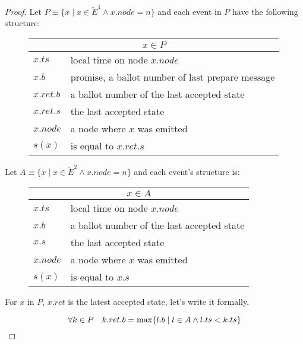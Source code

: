 \documentclass[12pt]{article}
\theoremstyle{definition}
\begin{document}
\begin{appendices}
\begin{proof}
  Let $P \equiv \{ x \;|\; x \in \ddot{E}^1 \land x.node = n\}$ and each event in $P$ have the following structure:

  \begin{figure}[!h]
    \centering
    \begin{tabular}{|l|l|}
    \hline
    \multicolumn{2}{|c|}{$x \in P$}\\
    \hline
    $x.ts$ & local time on node $x.node$\\
    \hline
    $x.b$ & promise, a ballot number of last prepare message\\
    \hline
    $x.ret.b$ & a ballot number of the last accepted state\\
    \hline
    $x.ret.s$ & the last accepted state\\
    \hline
    $x.node$ & a node where $x$ was emitted\\
    \hline
    \hline
    $s(x)$ & is equal to $x.ret.s$\\
    \hline
    \end{tabular}
  \end{figure}
  
  Let $A \equiv \{ x \;|\; x \in \ddot{E}^2 \land x.node = n \}$ and each event's structure is:

  \begin{figure}[!h]
    \centering
    \begin{tabular}{|l|l|}
    \hline
    \multicolumn{2}{|c|}{$x \in A$}\\
    \hline
    $x.ts$ & local time on node $x.node$\\
    \hline
    $x.b$ & a ballot number of the last accepted state\\
    \hline
    $x.s$ & the last accepted state\\
    \hline
    $x.node$ & a node where $x$ was emitted\\
    \hline
    \hline
    $s(x)$ & is equal to $x.s$\\
    \hline
    \end{tabular}
  \end{figure}

  For $x$ in $P$, $x.ret$ is the latest accepted state, let's write it formally.

  \begin{equation} \label{eq:last}
    \forall k \in P \quad k.ret.b = \max \{ l.b \;|\;l \in A \land l.ts < k.ts \} \\
  \end{equation}


\end{proof}
\end{appendices}
\end{document}
